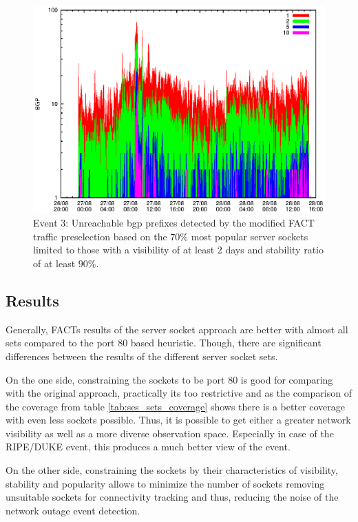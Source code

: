 \begin{figure}
	[p] \centering 
	\includegraphics[width=0.75\linewidth]{images/events/2010_08_27/bgp_log_Set_var_0_1_stab_9_vts_2.eps} \caption{Event 3: Unreachable \gls{bgp} prefixes detected by the modified \gls{FACT} traffic preselection based on the $70\%$ most popular \glspl{server socket} limited to those with a visibility of at least 2 days and stability ratio of at least $90\%$.} 
	\label{fig:RIPE_FACT_popularVTS2STAB9} 
\end{figure}

\newpage 
\subsection{Results} Generally, \gls{FACT}s results of the \gls{server socket} 
approach are better with almost all sets compared to the port 80 based 
heuristic. Though, there are significant differences between the results of the 
different \gls{server socket} sets. 

On the one side, constraining the sockets to be port 80 is good for comparing 
with the original approach, practically its too restrictive and as the 
comparison of the coverage from table \ref{tab:ses_sets_coverage} shows there is 
a better coverage with even less sockets possible. Thus, it is possible to get 
either a greater network visibility as well as a more diverse observation space. 
Especially in case of the RIPE/DUKE event, this produces a much better view of 
the event.  

On the other side, constraining the sockets by their characteristics of 
visibility, stability and popularity allows to minimize the number of sockets 
removing unsuitable sockets for connectivity tracking and thus, reducing the 
noise of the network outage event detection.

